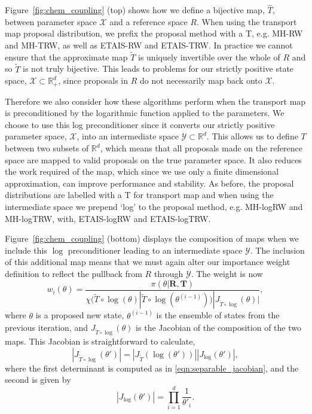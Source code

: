 \documentclass[final]{siamltex}
\begin{document}
Figure~\ref{fig:chem_coupling} (top) shows how we define a bijective map,
$\hat{T}$, between parameter space $\mathcal{X}$ and a reference space
$R$. When using the transport map proposal distribution, we prefix the proposal method with a T, e.g. MH-RW  and MH-TRW, as well as ETAIS-RW and ETAIS-TRW. In practice we cannot ensure that the approximate map $\tilde{T}$
is uniquely invertible over the whole of $R$ and so $\tilde{T}$ is not
truly bijective. This leads to problems for our strictly positive
state space, $\mathcal{X} \subset \mathbb{R}_+^d$, since proposals in
$R$ do not necessarily map back onto $\mathcal{X}$.

Therefore we also consider how these algorithms perform when the transport map
is preconditioned by the logarithmic function applied to the parameters. We choose to use this log
preconditioner since it converts our strictly positive parameter
space, $\mathcal{X}$, into an intermediate space $\mathcal{Y} \subset
\mathbb{R}^d$. This allows us to define $T$ between two subsets of
$\mathbb{R}^d$, which means that all proposals made on the reference
space are mapped to valid
proposals on the true parameter space. It also reduces the work required of the map, which since
we use only a finite dimensional approximation, can improve
performance and stability. As before, the proposal distributions are labelled with a T for transport map and when using the intermediate space we prepend `log' to the proposal method, e.g. MH-logRW and MH-logTRW, with, ETAIS-logRW and ETAIS-logTRW.

Figure~\ref{fig:chem_coupling} (bottom) displays the composition of maps
when we include this $\log$ preconditioner leading to an intermediate space $\mathcal{Y}$. The inclusion of this additional map means that we must again alter our importance weight definition to reflect the pullback from $R$ through $\mathcal{Y}$. The weight is now
\[
	w_i(\theta) = \frac{\pi(\theta|\mathbf{R},\mathbf{T})}{\chi(\tilde{T}\circ\log(\theta)|\tilde{T}\circ\log(\theta^{(i-1)}))|J_{\tilde{T}\circ\log}(\theta)|},
\]
where $\theta$ is a proposed new state, $\theta^{(i-1)}$ is the ensemble of states from the previous iteration, and $J_{\tilde{T}\circ\log}(\theta)$ is the Jacobian of the composition of the two maps. This Jacobian is straightforward to calculate,
\[
	|J_{\tilde{T}\circ\log}(\theta')| = |J_{\tilde{T}}(\log(\theta'))||J_{\log}(\theta')|,
\]
where the first determinant is computed as in
\eqref{eqn:separable_jacobian}, and the second is given by
\[
	|J_{\log}(\theta')| = \prod\limits_{i=1}^d \frac{1}{\theta'_i}.
\]
\end{document}
